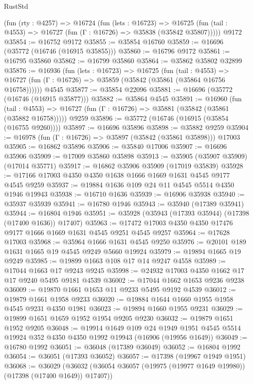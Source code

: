 \begin{lexlean}{RustStd}
\begin{coremodule}
    (fun (rty : @4257) =>
    @16724
      (fun (lets : @16723) =>
      @16725 (fun (tail : @4553) => @16727 (fun (Γ : @16726) => @35838 (@35842 @35807)))))
    @9172
@35854 := @16752 @9172
@35855 := @35854 @16760
@35859 := @16696 (@35772 (@16746 (@16915 @35855)))
@35860 := @16796 @9172
@35861 := @16795 @35860
@35862 := @16799 @35860
@35864 := @35862 @35802 @32899
@35876 := @16936
    (fun (lets : @16723) =>
    @16725
      (fun (tail : @4553) =>
      @16727 (fun (Γ : @16726) => @35859 (@35842 (@35861 (@35864 @16756 @16758))))))
    @4545
@35877 := @35854 @22096
@35881 := @16696 (@35772 (@16746 (@16915 @35877)))
@35882 := @35864 @4545
@35891 := @16960
    (fun (tail : @4553) => @16727 (fun (Γ : @16726) => @35881 (@35842 (@35861 (@35882 @16758)))))
    @9259
@35896 := @35772 (@16746 (@16915 (@35854 (@16755 @9260))))
@35897 := @16696 @35896
@35898 := @35882 @9259
@35904 := @16978 (fun (Γ : @16726) => @35897 (@35842 (@35861 @35898))) @17003
@35905 := @16862 @35896
@35906 := @35840 @17006
@35907 := @16696 @35906
@35909 := @17009 @35860 @35898
@35913 := @35905 (@35907 @35909) (@17014 @35771)
@35917 := @16862 @35906 @35909 (@17019 @35839)
@35928 := @17166 @17003 @4350 @4350 @1638 @1666 @1669 @1631 @4545 @9177 @4545 @9259
@35937 := @19884 @1636 @109 @24 @11 @4545 @5514 @4350 @1946 @19943
@35938 := @16710 @1636
@35939 := @16906 @35938
@35940 := @35937 @35939
@35941 := @16780 @1946
@35943 := @35940 (@17389 @35941)
@35944 := @16804 @1946
@35951 := @35928 (@35943 (@17393 @35944) (@17398 (@17400 @1636)) @17407)
@35963 := @17472 @17003 @4350 @4350 @17476 @9177 @1666 @1669 @1631 @4545 @9251 @4545 @9257
@35964 := @17628 @17003
@35968 := @35964 @1666 @1631 @4545 @9250
@35976 := @20101 @189 @1631 @1665 @19 @4545 @9249 @5660 @19924
@35979 := @19894 @1665 @19 @9249
@35985 := @19899 @1663 @108 @17 @14 @9247 @4558
@35989 := @17044 @1663 @17 @9243 @9245
@35998 := @24932 @17003 @4350 @1662 @17 @17 @9240 @5495 @9181 @4539
@36002 := @17044 @1662 @1653 @9236 @9238
@36009 := @19870 @1661 @1653 @11 @9233 @5495 @9192 @4539
@36012 := @19879 @1661 @1958 @9233
@36020 := @19884 @1644 @1660 @1955 @1958 @4545 @9231 @4350 @1981
@36023 := @19894 @1660 @1955 @9231
@36029 := @19899 @1651 @1659 @1952 @1954 @9205 @9230
@36032 := @19879 @1651 @1952 @9205
@36048 := @19914
    @1649
    @109
    @24
    @1949
    @1951
    @4545
    @5514
    @19924
    @352
    @4350
    @4350
    @1992
    @19943
    (@16906 (@19956 @1649))
@36049 := @16780 @1992
@36051 := @36048 (@17389 @36049)
@36052 := @16804 @1992
@36054 := @36051 (@17393 @36052)
@36057 := @17398 (@19967 @1949 @1951)
@36068 := @36029
    (@36032 (@36054 @36057 (@19975 (@19977 @1649 @19980)) (@17398 (@17400 @1649)) @17407))

\end{coremodule}
\end{lexlean}
